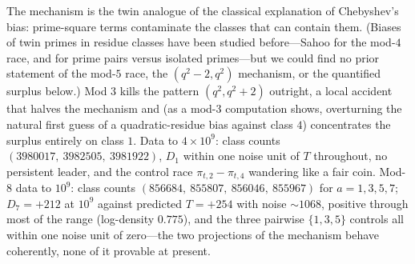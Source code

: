 \documentclass[11pt]{article}
\theoremstyle{definition}
\begin{document}
The mechanism is the twin analogue of the classical explanation of
Chebyshev's bias: prime-square terms contaminate the classes that can
contain them.  (Biases of twin primes in residue classes have been
studied before---Sahoo \cite{Sahoo} for the mod-$4$ race, and
\cite{PairBias} for prime pairs versus isolated primes---but we could
find no prior statement of the mod-$5$ race, the $(q^2-2,q^2)$
mechanism, or the quantified surplus below.)  Mod $3$ kills the pattern
$(q^2,q^2+2)$ outright, a local accident that halves the
mechanism and (as a mod-$3$ computation shows, overturning the natural first
guess
of a quadratic-residue bias against class $4$)
concentrates the surplus entirely on class $1$.  Data to $4\times10^9$:
class counts $(3980017,\ 3982505,\ 3981922)$, $D_1$ within one noise
unit of $T$ throughout, no persistent leader, and the
control race $\pi_{t,2}-\pi_{t,4}$ wandering like a fair coin.
Mod-8 data to $10^9$: class counts
$(856684,\ 855807,\ 856046,\ 855967)$ for $a=1,3,5,7$;
$D_7=+212$ at $10^9$ against predicted $T=+254$ with noise ${\sim}1068$,
positive through most of the range (log-density $0.775$), and the three
pairwise $\{1,3,5\}$ controls all within one noise unit of zero---the
two projections of the mechanism behave coherently, none of it provable
at present.
\end{document}
